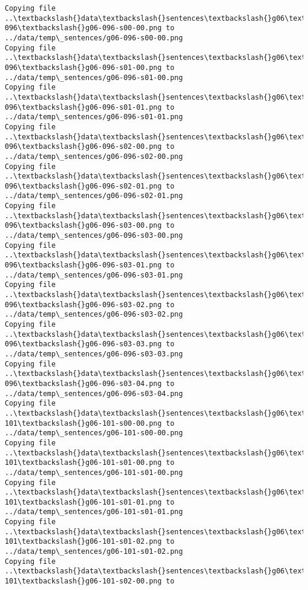 \documentclass[11pt]{article}
\begin{document}
\begin{Verbatim}[commandchars=\\\{\}]
Copying file ..\textbackslash{}data\textbackslash{}sentences\textbackslash{}g06\textbackslash{}g06-096\textbackslash{}g06-096-s00-00.png to
../data/temp\_sentences/g06-096-s00-00.png
Copying file ..\textbackslash{}data\textbackslash{}sentences\textbackslash{}g06\textbackslash{}g06-096\textbackslash{}g06-096-s01-00.png to
../data/temp\_sentences/g06-096-s01-00.png
Copying file ..\textbackslash{}data\textbackslash{}sentences\textbackslash{}g06\textbackslash{}g06-096\textbackslash{}g06-096-s01-01.png to
../data/temp\_sentences/g06-096-s01-01.png
Copying file ..\textbackslash{}data\textbackslash{}sentences\textbackslash{}g06\textbackslash{}g06-096\textbackslash{}g06-096-s02-00.png to
../data/temp\_sentences/g06-096-s02-00.png
Copying file ..\textbackslash{}data\textbackslash{}sentences\textbackslash{}g06\textbackslash{}g06-096\textbackslash{}g06-096-s02-01.png to
../data/temp\_sentences/g06-096-s02-01.png
Copying file ..\textbackslash{}data\textbackslash{}sentences\textbackslash{}g06\textbackslash{}g06-096\textbackslash{}g06-096-s03-00.png to
../data/temp\_sentences/g06-096-s03-00.png
Copying file ..\textbackslash{}data\textbackslash{}sentences\textbackslash{}g06\textbackslash{}g06-096\textbackslash{}g06-096-s03-01.png to
../data/temp\_sentences/g06-096-s03-01.png
Copying file ..\textbackslash{}data\textbackslash{}sentences\textbackslash{}g06\textbackslash{}g06-096\textbackslash{}g06-096-s03-02.png to
../data/temp\_sentences/g06-096-s03-02.png
Copying file ..\textbackslash{}data\textbackslash{}sentences\textbackslash{}g06\textbackslash{}g06-096\textbackslash{}g06-096-s03-03.png to
../data/temp\_sentences/g06-096-s03-03.png
Copying file ..\textbackslash{}data\textbackslash{}sentences\textbackslash{}g06\textbackslash{}g06-096\textbackslash{}g06-096-s03-04.png to
../data/temp\_sentences/g06-096-s03-04.png
Copying file ..\textbackslash{}data\textbackslash{}sentences\textbackslash{}g06\textbackslash{}g06-101\textbackslash{}g06-101-s00-00.png to
../data/temp\_sentences/g06-101-s00-00.png
Copying file ..\textbackslash{}data\textbackslash{}sentences\textbackslash{}g06\textbackslash{}g06-101\textbackslash{}g06-101-s01-00.png to
../data/temp\_sentences/g06-101-s01-00.png
Copying file ..\textbackslash{}data\textbackslash{}sentences\textbackslash{}g06\textbackslash{}g06-101\textbackslash{}g06-101-s01-01.png to
../data/temp\_sentences/g06-101-s01-01.png
Copying file ..\textbackslash{}data\textbackslash{}sentences\textbackslash{}g06\textbackslash{}g06-101\textbackslash{}g06-101-s01-02.png to
../data/temp\_sentences/g06-101-s01-02.png
Copying file ..\textbackslash{}data\textbackslash{}sentences\textbackslash{}g06\textbackslash{}g06-101\textbackslash{}g06-101-s02-00.png to

\end{Verbatim}
\end{document}
